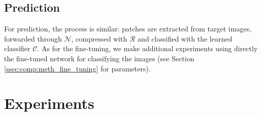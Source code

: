 \subsection{Prediction}
For prediction, the process is similar: patches are extracted from target images, forwarded through $\mathcal{N}$, compressed with $\mathcal{R}$ and classified with the learned classifier $\mathcal{C}$. 
As for the fine-tuning, we make additional experiments using directly the fine-tuned network for classifying the images (see Section \ref{ssec:comp:meth_fine_tuning} for parameters).











\section{Experiments}


